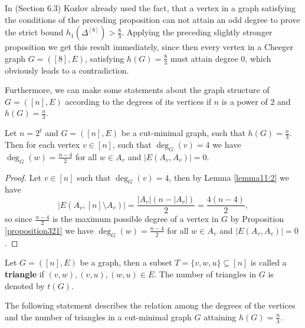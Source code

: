 \begin{expl}
In \cite{1} (Section 6.3) Kozlov already used the fact, that a vertex in a graph satisfying the conditions of the preceding proposition can not attain an odd degree to prove the strict bound \(h_1(\Delta^{[8]})>\frac{8}{3}\). Applying the preceding slightly stronger proposition we get this result immediately, since then every vertex in a Cheeger graph \(G=([8],E)\), satisfying \(h(G)=\frac{8}{3}\) must attain degree \(0\), which obviously leads to a contradiction.
\end{expl}

Furthermore, we can make some statements about the graph structure of \(G=([n],E)\) according to the degrees of its vertices if \(n\) is a power of \(2\) and \(h(G)=\frac{n}{3}\).

\begin{lem}\label{lemma362}
Let \(n=2^t\) and \(G=([n],E)\) be a cut-minimal graph, such that \(h(G)=\frac{n}{3}\). Then for each vertex \(v\in [n]\), such that \(\deg_G(v)=4\) we have \(\deg_G(w)=\frac{n-4}{2}\) for all \(w\in A_v\) and \(|E(A_v,A_v)|=0\).
\begin{proof}
Let \(v\in [n]\) such that \(\deg_G(v)=4\), then by Lemma \ref{lemma11:2} we have
\[
|E(A_v,[n]\setminus A_v)|=\frac{|A_v|(n-|A_v|)}{2}=\frac{4(n-4)}{2},
\]
so since \(\frac{n-4}{2}\) is the maximum possible degree of a vertex in \(G\) by Proposition \ref{proposition321} we have \(\deg_G(w)=\frac{n-4}{2}\) for all \(w\in A_v\) and \(|E(A_v,A_v)|=0\).
\end{proof}
\end{lem}

\begin{defi}
Let \(G=([n],E)\) be a graph, then a subset \(T=\{v,w,u\}\subseteq [n]\) is called a \textbf{triangle} if \((v,w),(v,u),(w,u)\in E\). The number of triangles in \(G\) is denoted by \(t(G)\).
\end{defi}

The following statement describes the relation among the degrees of the vertices and the number of triangles in a cut-minimal graph \(G\) attaining \(h(G)=\frac{n}{3}\).

